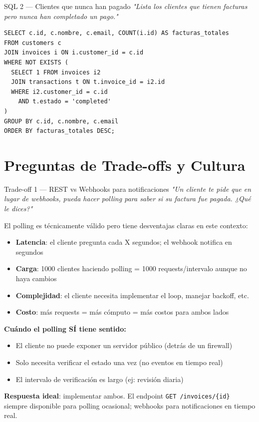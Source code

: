 \documentclass[11pt,a4paper]{article}
\begin{document}
\vspace{6pt}

\begin{preguntabox}{SQL 2 — Clientes que nunca han pagado}
\textit{"Lista los clientes que tienen facturas pero nunca han completado un pago."}
\end{preguntabox}

\begin{respuestabox}
\begin{lstlisting}[style=sql]
SELECT c.id, c.nombre, c.email, COUNT(i.id) AS facturas_totales
FROM customers c
JOIN invoices i ON i.customer_id = c.id
WHERE NOT EXISTS (
  SELECT 1 FROM invoices i2
  JOIN transactions t ON t.invoice_id = i2.id
  WHERE i2.customer_id = c.id
    AND t.estado = 'completed'
)
GROUP BY c.id, c.nombre, c.email
ORDER BY facturas_totales DESC;
\end{lstlisting}
\end{respuestabox}

\section{Preguntas de Trade-offs y Cultura}

\begin{preguntabox}{Trade-off 1 — REST vs Webhooks para notificaciones}
\textit{"Un cliente te pide que en lugar de webhooks, pueda hacer polling para saber si
su factura fue pagada. ¿Qué le dices?"}
\end{preguntabox}

\begin{respuestabox}
El polling es técnicamente válido pero tiene desventajas claras en este contexto:

\begin{itemize}[leftmargin=*]
  \item \textbf{Latencia}: el cliente pregunta cada X segundos; el webhook notifica en segundos
  \item \textbf{Carga}: 1000 clientes haciendo polling = 1000 requests/intervalo aunque no haya cambios
  \item \textbf{Complejidad}: el cliente necesita implementar el loop, manejar backoff, etc.
  \item \textbf{Costo}: más requests = más cómputo = más costos para ambos lados
\end{itemize}

\textbf{Cuándo el polling SÍ tiene sentido:}
\begin{itemize}[leftmargin=*]
  \item El cliente no puede exponer un servidor público (detrás de un firewall)
  \item Solo necesita verificar el estado una vez (no eventos en tiempo real)
  \item El intervalo de verificación es largo (ej: revisión diaria)
\end{itemize}

\textbf{Respuesta ideal}: implementar ambos. El endpoint \texttt{GET /invoices/\{id\}} siempre
disponible para polling ocasional; webhooks para notificaciones en tiempo real.
\end{respuestabox}
\end{document}
